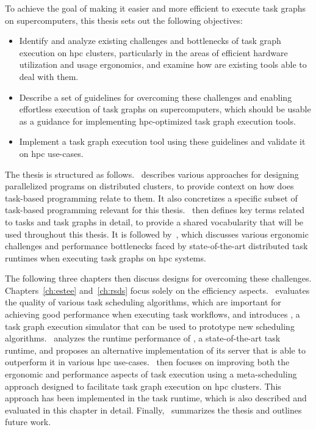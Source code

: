 To achieve the goal of making it easier and more efficient to execute task graphs on
supercomputers, this thesis sets out the following objectives:

\begin{itemize}
	\item Identify and analyze existing challenges and bottlenecks of task graph execution on
	      \gls{hpc} clusters, particularly in the areas of efficient hardware utilization and
	      usage ergonomics, and examine how are existing tools able to deal with them.
	\item Describe a set of guidelines for overcoming these challenges and enabling effortless execution of
	      task graphs on supercomputers, which should be usable as a guidance for implementing
	      \gls{hpc}-optimized task graph execution tools.
	\item Implement a task graph execution tool using these guidelines and validate it on
	      \gls{hpc} use-cases.
\end{itemize}

The thesis is structured as follows.~ describes various approaches for
designing parallelized programs on distributed clusters, to provide context on how does task-based
programming relate to them. It also concretizes a specific subset of task-based programming
relevant for this thesis.~ then defines key terms related to tasks and task
graphs in detail, to provide a shared vocabularity that will be used throughout this thesis. It is
followed by~, which discusses various ergonomic challenges and performance
bottlenecks faced by state-of-the-art distributed task runtimes when executing task graphs on
\gls{hpc} systems.

The following three chapters then discuss designs for overcoming these challenges.
Chapters~\ref{ch:estee} and~\ref{ch:rsds} focus solely on the efficiency
aspects.~ evaluates the quality of various task scheduling algorithms, which
are important for achieving good performance when executing task workflows, and introduces
\estee{}, a task graph execution simulator that can be used to prototype new
scheduling algorithms.~ analyzes the runtime performance of
\dask{}, a state-of-the-art task runtime, and proposes an alternative implementation
of its server that is able to outperform it in various \gls{hpc}
use-cases.~ then focuses on improving both the ergonomic and performance
aspects of task execution using a meta-scheduling approach designed to facilitate task graph
execution on \gls{hpc} clusters. This approach has been implemented in the
\hyperqueue{} task runtime, which is also described and evaluated in this chapter in
detail. Finally,~ summarizes the thesis and outlines future work.

